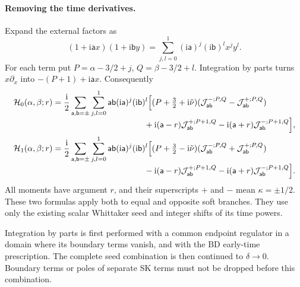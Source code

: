\documentclass[a4paper,12pt]{article}
\newcommand{\ii}{\mathrm i}
\newcommand{\tn}{\tilde\nu}
\def\aa{\mathsf a}
\newcommand{\bb}{\mathsf b}
\begin{document}
\paragraph{Removing the time derivatives.}
Expand the external factors as
\[
 (1+\ii \aa x)(1+\ii \bb y)=\sum_{j,l=0}^1(\ii \aa)^j(\ii \bb)^l x^j y^l.
\]
For each term put $P=\alpha-3/2+j$, $Q=\beta-3/2+l$.
Integration by parts turns $x\partial_x$ into
$-(P+1)+\ii \aa x$. Consequently
\begin{align}
 \mathcal H_0(\alpha,\beta;r)
 ={}&\frac{\ii}{2}\sum_{\aa,\bb=\pm}\sum_{j,l=0}^1
 \aa\bb(\ii \aa)^j(\ii \bb)^l
 \Big[(P+\tfrac32+\ii\tn)
    (\mathcal J_{\aa\bb}^{-;P,Q}-\mathcal J_{\aa\bb}^{+;P,Q})
 \nonumber\\[-1mm]
 &\hspace{34mm}
 +\ii(\aa-r)\mathcal J_{\aa\bb}^{+;P+1,Q}
 -\ii(\aa+r)\mathcal J_{\aa\bb}^{-;P+1,Q}\Big],
 \label{eq:whittaker-H0}\\
 \mathcal H_1(\alpha,\beta;r)
 ={}&\frac{\ii}{2}\sum_{\aa,\bb=\pm}\sum_{j,l=0}^1
 \aa\bb(\ii \aa)^j(\ii \bb)^l
 \Big[(P+\tfrac32-\ii\tn)
    (\mathcal J_{\aa\bb}^{-;P,Q}+\mathcal J_{\aa\bb}^{+;P,Q})
 \nonumber\\[-1mm]
 &\hspace{34mm}
 -\ii(\aa-r)\mathcal J_{\aa\bb}^{+;P+1,Q}
 -\ii(\aa+r)\mathcal J_{\aa\bb}^{-;P+1,Q}\Big].
 \label{eq:whittaker-H1}
\end{align}
All moments have argument $r$, and their superscripts $+$ and $-$
mean $\kappa=\pm1/2$. These two formulas apply both to equal and opposite
soft branches. They use only the existing scalar Whittaker seed and
integer shifts of its time powers.

Integration by parts is first performed with a common endpoint
regulator in a domain where its boundary terms vanish, and with the BD
early-time prescription. The complete seed combination is then
continued to $\delta\to0$. Boundary terms or poles of separate SK
terms must not be dropped before this combination.
\end{document}
